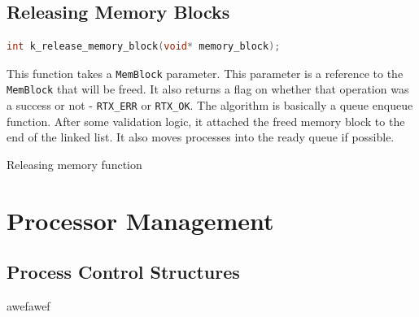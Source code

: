 \documentclass[12pt]{report}
\begin{document}
\subsection{Releasing Memory Blocks}

\begin{minipage}{\textwidth}
\begin{lstlisting}[language=C, frame=single]
int k_release_memory_block(void* memory_block);
\end{lstlisting}
\end{minipage}

This function takes a \texttt{MemBlock} parameter. This parameter is a reference to the \texttt{MemBlock} that will be freed. It also returns a flag on whether that operation was a success or not - \texttt{RTX_ERR} or \texttt{RTX_OK}. The algorithm is basically a queue enqueue function. After some validation logic, it attached the freed memory block to the end of the linked list. It also moves processes into the ready queue if possible.

\begin{algorithm}[H]
  \caption{Releasing memory function}
  \begin{algorithmic}[1]
	  \EndIf
	  \EndIf
	  \EndIf
	  \EndIf
    \EndProcedure
  \end{algorithmic}
\end{algorithm}

\pagebreak



\section{Processor Management}

\subsection{Process Control Structures}
awefawef
\end{document}
